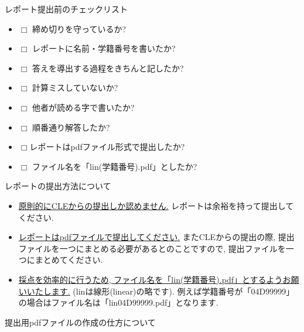 \documentclass[dvipdfmx,a4paper,11pt]{article}
\theoremstyle{definition}
\begin{document}
 \begin{tcolorbox}[
    colback = white,
    colframe = black,
    fonttitle = \bfseries,
    breakable = true]
    レポート提出前のチェックリスト
    \begin{itemize}
    \item[] $\Box$ 締め切りを守っているか?
    \item[] $\Box$ レポートに名前・学籍番号を書いたか?
     \item[] $\Box$ 答えを導出する過程をきちんと記したか?
     \item[] $\Box$ 計算ミスしていないか?
    \item[] $\Box$ 他者が読める字で書いたか?
    \item[] $\Box$ 順番通り解答したか?
    \item[] $\Box$レポートはpdfファイル形式で提出したか?
   \item[] $\Box$ ファイル名を「lin(学籍番号).pdf」としたか?
    \end{itemize}

  \end{tcolorbox}
  
 
\newpage
 \hspace{-11pt}
{\Large  レポートの提出方法について }

\begin{itemize}
\setlength{\parskip}{0cm} %
  \setlength{\itemsep}{0cm}
  \item \underline{原則的にCLEからの提出しか認めません.}
レポートは余裕を持って提出してください.
\item \underline{レポートはpdfファイルで提出してください.}
またCLEからの提出の際, 提出ファイルを一つにまとめる必要があるとのことですので, 提出ファイルを一つにまとめてください.
\item \underline{採点を効率的に行うため, ファイル名を「lin(学籍番号).pdf」とするようお願いいたします.}
(linは線形(linear)の略です).
例えば学籍番号が「04D99999」の場合はファイル名は「lin04D99999.pdf」となります.
\end{itemize}

 \hspace{-11pt}
{\Large 提出用pdfファイルの作成の仕方について}
\vspace{11pt}
\end{document}
